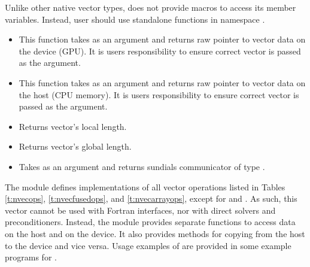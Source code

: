 Unlike other native {\sundials} vector types, {\nveccuda} does not provide macros
to access its member variables. Instead, user should use standalone functions in
namespace .
\begin{itemize}

\item

  This function takes  as an argument and returns raw pointer to vector
  data on the device (GPU). It is users responsibility to ensure correct vector is
  passed as the argument.

\item

  This function takes  as an argument and returns raw pointer to vector
  data on the host (CPU memory). It is users responsibility to ensure correct vector is
  passed as the argument.

\item {}

  Returns vector's local length.


\item {}

  Returns vector's global length.


\item {}

  Takes  as an argument and returns sundials communicator of type
  .

\end{itemize}


The {\nveccuda} module defines implementations of all vector operations listed
in Tables \ref{t:nvecops}, \ref{t:nvecfusedops}, and \ref{t:nvecarrayops}, except
for  and .
As such, this vector cannot be used with {\sundials} Fortran interfaces,
nor with {\sundials} direct solvers and preconditioners. Instead,
the {\nveccuda} module provides separate functions to access data on the host
and on the device. It also provides methods for copying from the host to
the device and vice versa. Usage examples of {\nveccuda} are provided in
some example programs for {\cvode} \cite{cvode_ex}.

